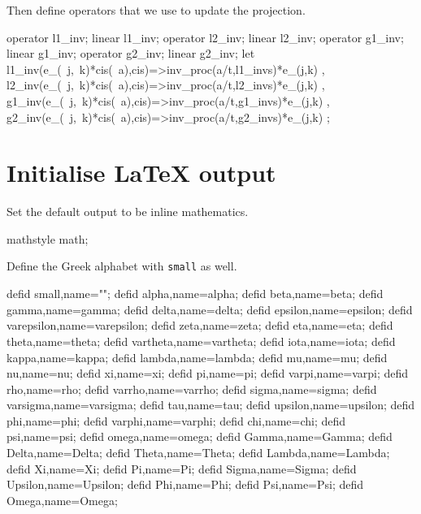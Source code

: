 \documentclass[11pt,a5paper]{article}
\def\eps{\varepsilon}
\begin{document}
Then define operators that we use to update the projection.
\begin{reduce}
operator l1_inv; linear l1_inv;
operator l2_inv; linear l2_inv;
operator g1_inv; linear g1_inv;
operator g2_inv; linear g2_inv;
let { l1_inv(e_(~j,~k)*cis(~a),cis)=>inv_proc(a/t,l1_invs)*e_(j,k)
    , l2_inv(e_(~j,~k)*cis(~a),cis)=>inv_proc(a/t,l2_invs)*e_(j,k)
    , g1_inv(e_(~j,~k)*cis(~a),cis)=>inv_proc(a/t,g1_invs)*e_(j,k)
    , g2_inv(e_(~j,~k)*cis(~a),cis)=>inv_proc(a/t,g2_invs)*e_(j,k)
    };
\end{reduce}








%

\section{Initialise LaTeX output}
%

Set the default output to be inline mathematics.
\begin{reduce}
mathstyle math;
\end{reduce}

Define the Greek alphabet with \verb|small| as well.
\begin{reduce}
defid small,name="\eps";%
defid alpha,name=alpha;
defid beta,name=beta;
defid gamma,name=gamma;
defid delta,name=delta;
defid epsilon,name=epsilon;
defid varepsilon,name=varepsilon;
defid zeta,name=zeta;
defid eta,name=eta;
defid theta,name=theta;
defid vartheta,name=vartheta;
defid iota,name=iota;
defid kappa,name=kappa;
defid lambda,name=lambda;
defid mu,name=mu;
defid nu,name=nu;
defid xi,name=xi;
defid pi,name=pi;
defid varpi,name=varpi;
defid rho,name=rho;
defid varrho,name=varrho;
defid sigma,name=sigma;
defid varsigma,name=varsigma;
defid tau,name=tau;
defid upsilon,name=upsilon;
defid phi,name=phi;
defid varphi,name=varphi;
defid chi,name=chi;
defid psi,name=psi;
defid omega,name=omega;
defid Gamma,name=Gamma;
defid Delta,name=Delta;
defid Theta,name=Theta;
defid Lambda,name=Lambda;
defid Xi,name=Xi;
defid Pi,name=Pi;
defid Sigma,name=Sigma;
defid Upsilon,name=Upsilon;
defid Phi,name=Phi;
defid Psi,name=Psi;
defid Omega,name=Omega;
\end{reduce}
\end{document}
